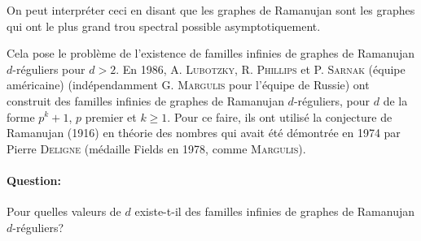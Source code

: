 On peut interpréter ceci en disant que les graphes de Ramanujan sont les graphes \og qui ont le plus grand
trou spectral possible\fg{} asymptotiquement.

Cela pose le problème de l'existence de familles infinies de graphes de Ramanujan $d$-réguliers pour $d >
2$. En 1986, A. \textsc{Lubotzky}, R. \textsc{Phillips} et P. \textsc{Sarnak} (équipe américaine) (indépendamment
G. \textsc{Margulis} pour l'équipe de Russie) ont construit des familles infinies de graphes de Ramanujan
$d$-réguliers, pour $d$ de la forme $p^{k}+1$, $p$ premier et $k \geq 1$. Pour ce faire, ils ont utilisé la
conjecture de Ramanujan (1916) en théorie des nombres qui avait été démontrée en 1974 par Pierre \textsc{Deligne}
(médaille Fields en 1978, comme \textsc{Margulis}).

\paragraph{Question:}

Pour quelles valeurs de $d$ existe-t-il des familles infinies de graphes de Ramanujan $d$-réguliers?







